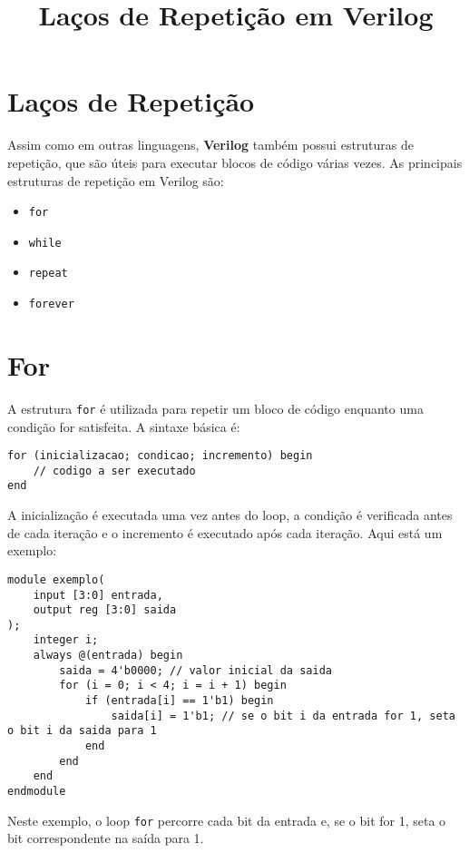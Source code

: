 \documentclass{article}
\title{Laços de Repetição em Verilog}
\date{}
\begin{document}
\maketitle

\section*{Laços de Repetição}

Assim como em outras linguagens, \textbf{Verilog} também possui estruturas de repetição, que são úteis para executar blocos de código várias vezes. As principais estruturas de repetição em Verilog são:

\begin{itemize}
  \item \texttt{for}
  \item \texttt{while}
  \item \texttt{repeat}
  \item \texttt{forever}
\end{itemize}

\section*{For}

A estrutura \texttt{for} é utilizada para repetir um bloco de código enquanto uma condição for satisfeita. A sintaxe básica é:

\begin{lstlisting}
for (inicializacao; condicao; incremento) begin
    // codigo a ser executado
end
\end{lstlisting}

A inicialização é executada uma vez antes do loop, a condição é verificada antes de cada iteração e o incremento é executado após cada iteração. Aqui está um exemplo:

\begin{lstlisting}
module exemplo(
    input [3:0] entrada,
    output reg [3:0] saida
);
    integer i;
    always @(entrada) begin
        saida = 4'b0000; // valor inicial da saida
        for (i = 0; i < 4; i = i + 1) begin
            if (entrada[i] == 1'b1) begin
                saida[i] = 1'b1; // se o bit i da entrada for 1, seta o bit i da saida para 1
            end
        end
    end
endmodule 
\end{lstlisting}

Neste exemplo, o loop \texttt{for} percorre cada bit da entrada e, se o bit for 1, seta o bit correspondente na saída para 1.
\end{document}
